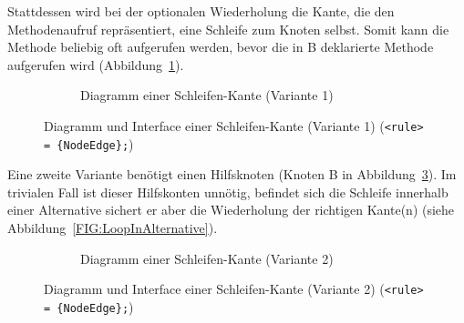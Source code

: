 \documentclass[../InterneDSLs.tex]{subfiles}
\begin{document}
Stattdessen wird bei der optionalen Wiederholung die Kante, die den Methodenaufruf repräsentiert, eine Schleife zum Knoten selbst. Somit kann die Methode beliebig oft aufgerufen werden, bevor die in B deklarierte Methode aufgerufen wird (Abbildung~\ref{FIG:DiagramLoopNode}).
\begin{figure}[ht]
\centering
  \begin{subfigure}[c]{0.49\textwidth}
    \caption{Diagramm einer Schleifen-Kante (Variante 1)}
    \label{FIG:DiagramLoopNode}
  \end{subfigure}
  \begin{subfigure}[c]{0.49\textwidth}
    
  \end{subfigure}
  \caption{Diagramm und Interface einer Schleifen-Kante (Variante 1) (\texttt{<rule> = \{NodeEdge\};})}
  \label{FIG:LoopNode}
\end{figure}

Eine zweite Variante benötigt einen Hilfsknoten (Knoten B in Abbildung~\ref{FIG:DiagramLoopNodeAlt}). Im trivialen Fall ist dieser Hilfskonten unnötig, befindet sich die Schleife innerhalb einer Alternative sichert er aber die Wiederholung der richtigen Kante(n) (siehe Abbildung~\ref{FIG:LoopInAlternative}).
\begin{figure}[ht]
\centering
  \begin{subfigure}[c]{0.49\textwidth}
    \caption{Diagramm einer Schleifen-Kante (Variante 2)}
    \label{FIG:DiagramLoopNodeAlt}
  \end{subfigure}
  \begin{subfigure}[c]{0.49\textwidth}
    
  \end{subfigure}
  \caption{Diagramm und Interface einer Schleifen-Kante (Variante 2) (\texttt{<rule> = \{NodeEdge\};})}
  \label{FIG:LoopNodeAlt}
\end{figure}
\end{document}

